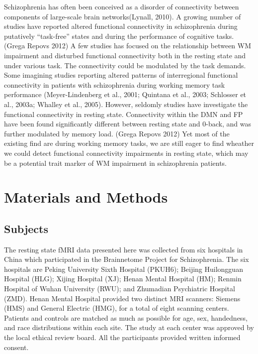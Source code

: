 \documentclass[preprint,authoryear,review,12pt,times]{elsarticle}
\begin{document}
Schizophrenia has often been conceived as a disorder of connectivity between components of large-scale brain networks(Lynall, 2010). A growing number of studies have reported altered functional connectivity in schizophrenia during putatively “task-free” states and during the performance of cognitive tasks. (Grega Repovs 2012)  A few studies has focused on the relationship between WM impairment and disturbed functional connectivity both in the resting state and under various task. The connectivity could be modulated by the task demands. Some imagining studies reporting altered patterns of interregional functional connectivity in patients with schizophrenia during working memory task performance (Meyer-Lindenberg et al., 2001; Quintana et al., 2003; Schlosser et al., 2003a; Whalley et al., 2005). However, seldomly studies have investigate the functional connectivity in resting state. Connectivity within the DMN and FP have been found significantly different between resting state and 0-back, and was further modulated by memory load. (Grega Repovs 2012) Yet most of the existing find are during working memory tasks, we are still eager to find wheather we could detect functional connectivity impairments in resting state, which may be a potential trait marker of WM impairment in schizophrenia patients.

\section*{Materials and Methods}

\subsection*{Subjects}

The resting state fMRI data presented here was collected from six hospitals in China which participated in the Brainnetome Project for Schizophrenia. The six hospitals are Peking University Sixth Hospital (PKUH6); Beijing Huilongguan Hospital (HLG); Xijing Hospital (XJ); Henan Mental Hospital (HM);  Renmin Hospital of Wuhan University (RWU); and Zhumadian Psychiatric Hospital (ZMD). Henan Mental Hospital provided two distinct MRI scanners: Siemens (HMS) and General Electric (HMG), for a total of eight scanning centers. Patients and controls are matched as much as possible for age, sex, handedness, and race distributions within each site. The study at each center was approved by the local ethical review board. All the participants provided written informed consent.
\end{document}
